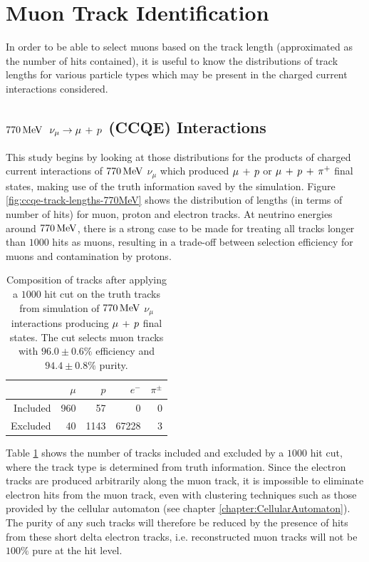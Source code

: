 \section{Muon Track Identification}
In order to be able to select muons based on the track length (approximated as the number of hits contained), it is useful to know the distributions of track lengths for various particle types which may be present in the charged current interactions considered. 

\subsection{$770\MeV$ $\nu_\mu \rightarrow \mu\,+\,p$ (CCQE) Interactions}
This study begins by looking at those distributions for the products of charged current interactions of $770\MeV$ $\nu_\mu$ which produced $\mu\,+\,p$ or $\mu\,+\,p\,+\,\pi^{+}$ final states, making use of the truth information saved by the simulation. Figure \ref{fig:ccqe-track-lengths-770MeV} shows the distribution of lengths (in terms of number of hits) for muon, proton and electron tracks. At neutrino energies around $770\MeV$, there is a strong case to be made for treating all tracks longer than $1000$ hits as muons, resulting in a trade-off between selection efficiency for muons and contamination by protons.

\begin{table}
\centering
\begin{tabular}{*{5}{r}}
 & $\mu$ & $p$ & $e^-$ & $\pi^\pm$ \\
\hline
\hline
Included & 960 & 57 & 0 & 0 \\
Excluded & 40 & 1143 & 67228 & 3 \\
\hline
\end{tabular}
\caption[Composition of tracks after $1000$ hit cut on $770\MeV$ CCQE events]{\label{table:cut-results-ccqe-0.77}Composition of tracks after applying a $1000$ hit cut on the truth tracks from simulation of $770\MeV$ $\nu_\mu$ interactions producing $\mu\,+\,p$ final states. The cut selects muon tracks with $96.0\pm0.6\%$ efficiency and $94.4\pm0.8\%$ purity.}
\end{table}

Table \ref{table:cut-results-ccqe-0.77} shows the number of tracks included and excluded by a $1000$ hit cut, where the track type is determined from truth information. Since the electron tracks are produced arbitrarily along the muon track, it is impossible to eliminate electron hits from the muon track, even with clustering techniques such as those provided by the cellular automaton (see chapter \ref{chapter:CellularAutomaton}). The purity of any such tracks will therefore be reduced by the presence of hits from these short delta electron tracks, i.e. reconstructed muon tracks will not be $100\%$ pure at the hit level.


